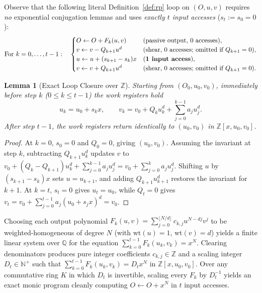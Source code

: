 \documentclass[11pt,reqno]{amsart}
\newtheorem{lemma}[theorem]{Lemma}
\theoremstyle{definition}
\newcommand{\Q}{\mathbb{Q}}
\newcommand{\Z}{\mathbb{Z}}
\newcommand{\N}{\mathbb{N}}
\begin{document}
Observe that the following literal Definition~\ref{def:rp} loop on $(O, u, v)$ requires \emph{no} exponential conjugation lemmas and uses \emph{exactly $t$ input accesses} ($s_t := s_0 = 0$):
\begin{equation}
\label{eq:loop-step}
  \text{For } k = 0, \dots, t - 1:\quad
  \begin{cases}
    O \leftarrow O + F_k(u, v) & \text{(passive output, $0$ accesses)}, \\
    v \leftarrow v - Q_{k+1} u^d & \text{(shear, $0$ accesses; omitted if $Q_{k+1}=0$)}, \\
    u \leftarrow u + (s_{k+1} - s_k) x & \text{(\textbf{1 input access})}, \\
    v \leftarrow v + Q_{k+1} u^d & \text{(shear, $0$ accesses; omitted if $Q_{k+1}=0$)}.
  \end{cases}
\end{equation}

\begin{lemma}[Exact Loop Closure over $\Z$]
\label{lem:closure}
Starting from $(O_0, u_0, v_0)$, immediately before step $k$ ($0 \le k \le t - 1$) the work registers hold
\[
  u_k = u_0 + s_k x, \qquad v_k = v_0 + Q_k u_k^d + \sum_{j=0}^{k-1} a_j u_j^d.
\]
After step $t - 1$, the work registers return identically to $(u_0, v_0)$ in $\Z[x, u_0, v_0]$.
\end{lemma}

\begin{proof}
At $k = 0$, $s_0 = 0$ and $Q_0 = 0$, giving $(u_0, v_0)$.
Assuming the invariant at step $k$, subtracting $Q_{k+1} u_k^d$ updates $v$ to $v_0 + (Q_k - Q_{k+1}) u_k^d + \sum_{j=0}^{k-1} a_j u_j^d = v_0 + \sum_{j=0}^k a_j u_j^d$.
Shifting $u$ by $(s_{k+1} - s_k) x$ sets $u = u_{k+1}$, and adding $Q_{k+1} u_{k+1}^d$ restores the invariant for $k + 1$.
At $k = t$, $s_t = 0$ gives $u_t = u_0$, while $Q_t = 0$ gives $v_t = v_0 + \sum_{j=0}^{t-1} a_j (u_0 + s_j x)^d = v_0$.
\end{proof}

Choosing each output polynomial $F_k(u, v) = \sum_{j=0}^{\lfloor N/d \rfloor} c_{k,j} u^{N - dj} v^j$ to be weighted-homogeneous of degree $N$ (with $\mathrm{wt}(u) = 1$, $\mathrm{wt}(v) = d$) yields a finite linear system over $\Q$ for the equation $\sum_{k=0}^{t-1} F_k(u_k, v_k) = x^N$.
Clearing denominators produces pure integer coefficients $c_{k,j} \in \Z$ and a scaling integer $D_t \in \N^+$ such that $\sum_{k=0}^{t-1} F_k(u_k, v_k) = D_t x^N$ in $\Z[x, u_0, v_0]$.
Over any commutative ring $K$ in which $D_t$ is invertible, scaling every $F_k$ by $D_t^{-1}$ yields an exact monic program cleanly computing $O \leftarrow O + x^N$ in $t$ input accesses.
\end{document}
